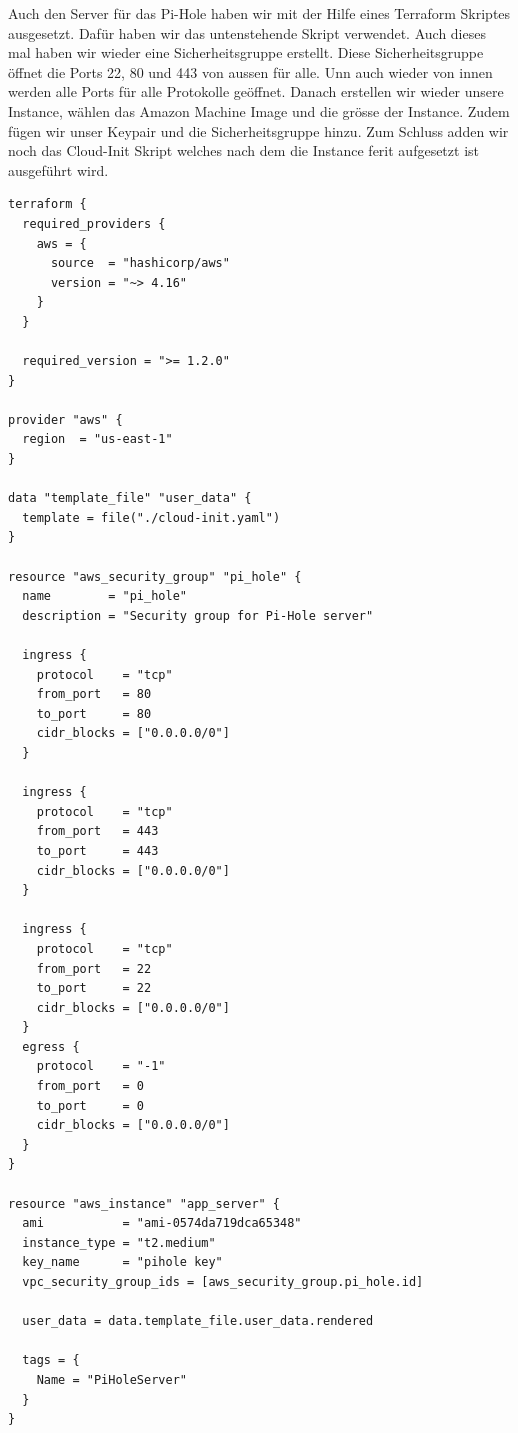 \documentclass{article}
\begin{document}
\vspace{10pt}

\noindent Auch den Server für das Pi-Hole haben wir mit der Hilfe eines Terraform Skriptes ausgesetzt. Dafür haben wir das untenstehende Skript verwendet. Auch dieses mal haben wir wieder eine Sicherheitsgruppe erstellt. Diese Sicherheitsgruppe öffnet die Ports 22, 80 und 443 von aussen für alle. Unn auch wieder von innen werden alle Ports für alle Protokolle geöffnet. Danach erstellen wir wieder unsere Instance, wählen das Amazon Machine Image und die grösse der Instance. Zudem fügen wir unser Keypair und die Sicherheitsgruppe hinzu. Zum Schluss adden wir noch das Cloud-Init Skript welches nach dem die Instance ferit aufgesetzt ist ausgeführt wird.

\vspace{30pt}

\begin{lstlisting}[caption=Terraform Script für Pi-hole Server]
terraform {
  required_providers {
    aws = {
      source  = "hashicorp/aws"
      version = "~> 4.16"
    }
  }

  required_version = ">= 1.2.0"
}

provider "aws" {
  region  = "us-east-1"
}

data "template_file" "user_data" {
  template = file("./cloud-init.yaml")
}

resource "aws_security_group" "pi_hole" {
  name        = "pi_hole"
  description = "Security group for Pi-Hole server"

  ingress {
    protocol    = "tcp"
    from_port   = 80
    to_port     = 80
    cidr_blocks = ["0.0.0.0/0"]
  }
  
  ingress {
    protocol    = "tcp"
    from_port   = 443
    to_port     = 443
    cidr_blocks = ["0.0.0.0/0"]
  }
  
  ingress {
    protocol    = "tcp"
    from_port   = 22
    to_port     = 22
    cidr_blocks = ["0.0.0.0/0"]
  }
  egress {
    protocol    = "-1"
    from_port   = 0
    to_port     = 0
    cidr_blocks = ["0.0.0.0/0"]
  }
}

resource "aws_instance" "app_server" {
  ami           = "ami-0574da719dca65348"
  instance_type = "t2.medium"
  key_name      = "pihole key"
  vpc_security_group_ids = [aws_security_group.pi_hole.id]
  
  user_data = data.template_file.user_data.rendered

  tags = {
    Name = "PiHoleServer"
  }
}
\end{lstlisting}
\end{document}
